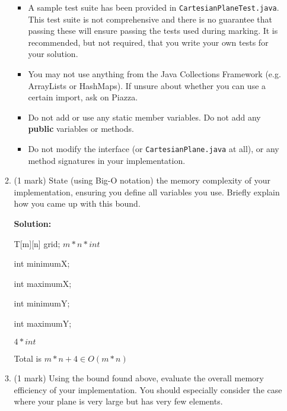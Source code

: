 \documentclass[a4,13pt]{extarticle}
\newenvironment{Solution}{\color{blue}\textbf{Solution:}}{}
\begin{document}
\begin{enumerate}
\begin{enumerate}
\begin{itemize}
	      	      	\item  A sample test suite has been provided in \texttt{CartesianPlaneTest.java}. 
	      	      	      This test suite is not comprehensive and there is no guarantee that passing these will ensure passing 
	      	      	      the tests used during marking. It is recommended, but not required, that you write your own tests for your solution.
	      	      	      	      	    
	      	      	      	   	                          
	      	      	\item You may not use anything from the Java Collections Framework (e.g. ArrayLists or HashMaps). If unsure about whether you can use a certain import, ask on Piazza.
	      	      	                               
	      	      	\item Do not add or use any static member variables. Do not add any \textbf{public} variables or methods.
	      	      	\item Do not modify the interface (or \texttt{CartesianPlane.java} at all), or any method signatures in your implementation.
	      	      \end{itemize}
	      	      	      	                      
	      	\item (1 mark) State (using Big-O notation) the memory complexity of your implementation, 
	      	      ensuring you define all variables you use. Briefly explain how you came up with this bound.
	      	      
	        \begin{Solution}
	        
	        T[m][n] grid; $m*n * int$
	        
             int minimumX;
             
             int maximumX;
             
             int minimumY;
             
             int maximumY;
             
             $4 * int$
             
             Total is $m*n + 4 \in O(m*n)$ 
	      	\end{Solution}
	      	      	      	                      
	      	\item (1 mark) Using the bound found above, evaluate the overall memory efficiency of your implementation. 
	      	      You should especially consider the case where your plane is very large but has very few elements.
	      	

\end{enumerate}
\end{enumerate}
\end{document}

